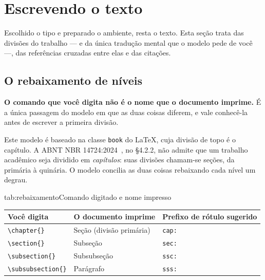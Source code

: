 \chapter{Escrevendo o texto}\label{cap:texto}

Escolhido o tipo e preparado o ambiente, resta o texto. Esta seção trata das divisões do trabalho
--- e da única tradução mental que o modelo pede de você ---, das referências cruzadas entre elas e
das citações.

\section{O rebaixamento de níveis}\label{sec:rebaixamento}

\textbf{O comando que você digita não é o nome que o documento imprime.} É a única passagem do
modelo em que as duas coisas diferem, e vale conhecê-la antes de escrever a primeira divisão.

Este modelo é baseado na classe \texttt{book} do \LaTeX{}, cuja divisão de topo é o capítulo. A ABNT
NBR 14724:2024~\cite{nbr14724:2024}, no §4.2.2, não admite que um trabalho acadêmico seja dividido
em \emph{capítulos}: suas divisões chamam-se seções, da primária à quinária. O modelo concilia as
duas coisas rebaixando cada nível um degrau.

\begin{tabelaabnt}{tab:rebaixamento}{Comando digitado e nome impresso}
    \begin{tabular}{@{}llp{}@{}}
        \toprule
        \textbf{Você digita} & \textbf{O documento imprime} & \textbf{Prefixo de rótulo sugerido} \\
        \midrule
        \texttt{\textbackslash chapter\{\}}       & Seção (divisão primária) & \texttt{cap:} \\
        \texttt{\textbackslash section\{\}}       & Subseção                 & \texttt{sec:} \\
        \texttt{\textbackslash subsection\{\}}    & Subsubseção              & \texttt{ssc:} \\
        \texttt{\textbackslash subsubsection\{\}} & Parágrafo                & \texttt{sss:} \\
        \bottomrule
    \end{tabular}
\end{tabelaabnt}

